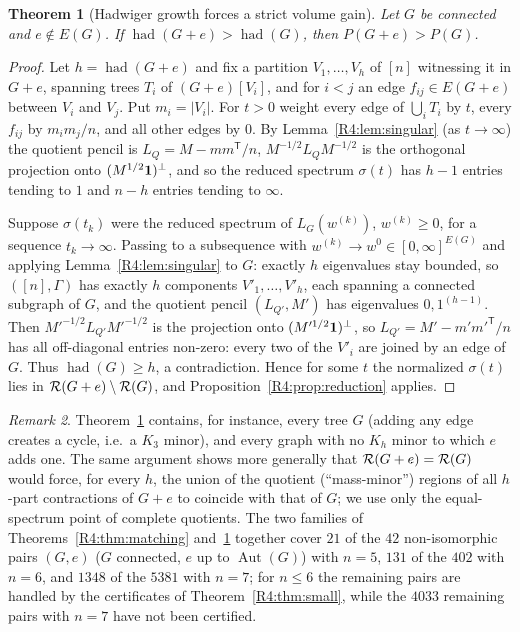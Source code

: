 \documentclass[11pt]{amsart}
\newtheorem{theorem}{Theorem}[section]
\theoremstyle{definition}
\theoremstyle{remark}
\newtheorem{remark}[theorem]{Remark}
\begin{document}
\begin{theorem}[Hadwiger growth forces a strict volume gain]\label{R4:thm:hadwiger}
Let $G$ be connected and $e\notin E(G)$.  If
$\operatorname{had}(G+e)>\operatorname{had}(G)$, then $P(G+e)>P(G)$.
\end{theorem}

\begin{proof}
Let $h=\operatorname{had}(G+e)$ and fix a partition $V_1,\dots,V_h$ of
$[n]$ witnessing it in $G+e$, spanning trees $T_i$ of $(G+e)[V_i]$, and
for $i<j$ an edge $f_{ij}\in E(G+e)$ between $V_i$ and $V_j$.  Put
$m_i=|V_i|$.  For $t>0$ weight every edge of $\bigcup_iT_i$ by $t$, every
$f_{ij}$ by $m_im_j/n$, and all other edges by $0$.  By
Lemma~\ref{R4:lem:singular} (as $t\to\infty$) the quotient pencil is
$L_Q=M-mm^{\mathsf T}/n$, $M^{-1/2}L_QM^{-1/2}$ is the orthogonal
projection onto $(M^{1/2}\mathbf{1})^\perp$, and so the reduced spectrum
$\sigma(t)$ has $h-1$ entries tending to $1$ and $n-h$ entries tending to
$\infty$.

Suppose $\sigma(t_k)$ were the reduced spectrum of $L_G(w^{(k)})$,
$w^{(k)}\ge0$, for a sequence $t_k\to\infty$.  Passing to a subsequence
with $w^{(k)}\to w^0\in[0,\infty]^{E(G)}$ and applying
Lemma~\ref{R4:lem:singular} to $G$: exactly $h$ eigenvalues stay bounded,
so $([n],\Gamma)$ has exactly $h$ components $V'_1,\dots,V'_h$, each
spanning a connected subgraph of $G$, and the quotient pencil
$(L_{Q'},M')$ has eigenvalues $0,1^{(h-1)}$.  Then
$M'^{-1/2}L_{Q'}M'^{-1/2}$ is the projection onto $(M'^{1/2}\mathbf{1})^\perp$, so
$L_{Q'}=M'-m'm'^{\mathsf T}/n$ has all off-diagonal entries non-zero: every
two of the $V'_i$ are joined by an edge of $G$.  Thus
$\operatorname{had}(G)\ge h$, a contradiction.  Hence for some $t$ the
normalized $\sigma(t)$ lies in $\mathcal{R}(G+e)\setminus\mathcal{R}(G)$, and
Proposition~\ref{R4:prop:reduction} applies.
\end{proof}

\begin{remark}
Theorem~\ref{R4:thm:hadwiger} contains, for instance, every tree $G$ (adding
any edge creates a cycle, i.e.\ a $K_3$ minor), and every graph with no
$K_h$ minor to which $e$ adds one.  The same argument shows more
generally that $\mathcal{R}(G+e)=\mathcal{R}(G)$ would force, for every $h$, the union of
the quotient (``mass-minor'') regions of all $h$-part contractions of
$G+e$ to coincide with that of $G$; we use only the equal-spectrum point
of complete quotients.  The two families of
Theorems~\ref{R4:thm:matching} and~\ref{R4:thm:hadwiger} together cover
$21$ of the $42$ non-isomorphic pairs $(G,e)$ ($G$ connected, $e$ up to
$\operatorname{Aut}(G)$) with $n=5$, $131$ of the $402$ with $n=6$, and
$1348$ of the $5381$ with $n=7$; for $n\le6$ the remaining pairs are
handled by the certificates of Theorem~\ref{R4:thm:small}, while the
$4033$ remaining pairs with $n=7$ have not been certified.
\end{remark}
\end{document}
